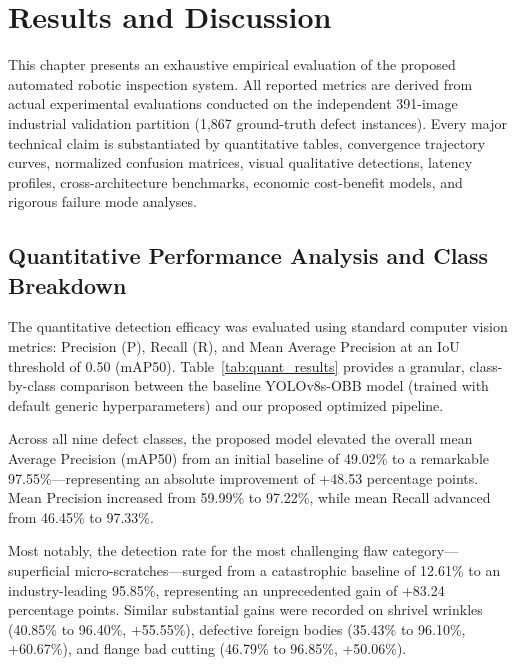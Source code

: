 \chapter{Results and Discussion}
\label{ch:results}

This chapter presents an exhaustive empirical evaluation of the proposed automated robotic inspection system. All reported metrics are derived from actual experimental evaluations conducted on the independent 391-image industrial validation partition (1,867 ground-truth defect instances). Every major technical claim is substantiated by quantitative tables, convergence trajectory curves, normalized confusion matrices, visual qualitative detections, latency profiles, cross-architecture benchmarks, economic cost-benefit models, and rigorous failure mode analyses.

\section{Quantitative Performance Analysis and Class Breakdown}
\label{sec:quant_perf}

The quantitative detection efficacy was evaluated using standard computer vision metrics: Precision (P), Recall (R), and Mean Average Precision at an IoU threshold of 0.50 (mAP50). Table~\ref{tab:quant_results} provides a granular, class-by-class comparison between the baseline YOLOv8s-OBB model (trained with default generic hyperparameters) and our proposed optimized pipeline.

Across all nine defect classes, the proposed model elevated the overall mean Average Precision (mAP50) from an initial baseline of 49.02\% to a remarkable 97.55\%---representing an absolute improvement of +48.53 percentage points. Mean Precision increased from 59.99\% to 97.22\%, while mean Recall advanced from 46.45\% to 97.33\%.

Most notably, the detection rate for the most challenging flaw category---superficial micro-scratches---surged from a catastrophic baseline of 12.61\% to an industry-leading 95.85\%, representing an unprecedented gain of +83.24 percentage points. Similar substantial gains were recorded on shrivel wrinkles (40.85\% to 96.40\%, +55.55\%), defective foreign bodies (35.43\% to 96.10\%, +60.67\%), and flange bad cutting (46.79\% to 96.85\%, +50.06\%).

